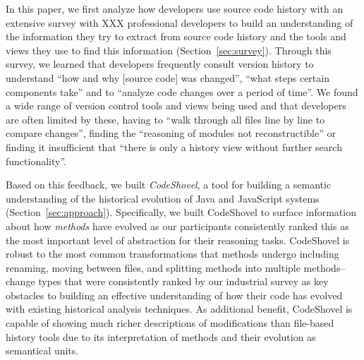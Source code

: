 In this paper, we first analyze how developers use source code history with an extensive survey with XXX professional developers to build an understanding of the information they try to extract from source code history and the tools and views they use to find this information (Section~\ref{sec:survey}).
Through this survey, we learned that developers frequently consult version history to understand ``how and why [source code] was changed'', ``what steps certain components take'' and to ``analyze code changes over a period of time''. We found a wide range of version control tools and views being used and that developers are often limited by these, having to ``walk through all files line by line to compare changes'', finding the ``reasoning of modules not reconstructible'' or finding it insufficient that ``there is only a history view without further search functionality''.

Based on this feedback, we built \textit{CodeShovel}, a tool for building a semantic understanding of the historical evolution of Java and JavaScript systems (Section~\ref{sec:approach}).
Specifically, we built CodeShovel to surface information about how \textit{methods} have evolved as our participants consistently ranked this as the most important level of abstraction for their reasoning tasks.
CodeShovel is robust to the most common transformations that methods undergo including renaming, moving between files, and splitting methods into multiple methods--change types that were consistently ranked by our industrial survey as key obstacles to building an effective understanding of how their code has evolved with existing historical analysis techniques. %
As additional benefit, CodeShovel is capable of showing much richer descriptions of modifications than file-based history tools due to its interpretation of methods and their evolution as semantical units.

